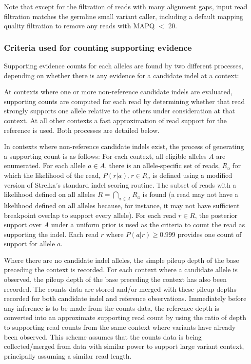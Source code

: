 \documentclass{article}
\begin{document}
Note that except for the filtration of reads with many alignment gaps, input read filtration matches the germline small variant caller, including a default mapping quality filtration to remove any reads with MAPQ $<$ 20.

\subsubsection{Criteria used for counting supporting evidence}

Supporting evidence counts for each alleles are found by two different processes, depending on whether there is any evidence for a candidate indel at a context:

At contexts where one or more non-reference candidate indels are evaluated, supporting counts are computed for each read by determining whether that read strongly supports one allele relative to the others under consideration at that context. At all other contexts a fast approximation of read support for the reference is used. Both processes are detailed below.

In contexts where non-reference candidate indels exist, the process of generating a supporting count is as follows: For each context, all eligible alleles $A$ are enumerated. For each allele $a \in A$, there is an allele-specific set of reads, $R_a$ for which the likelihood of the read, $P( r \vert a ), r \in R_a$ is defined using a modified version of Strelka's standard indel scoring routine. The subset of reads with a likelihood defined on all alleles $R = \bigcap_{a \in A} R_a$ is found (a read may not have a likelihood defined on all alleles because, for instance, it may not have sufficient breakpoint overlap to support every allele). For each read $r \in R$, the posterior support over $A$ under a uniform prior is used as the criteria to count the read as supporting the indel. Each read $r$ where $P( a \vert r ) \geq 0.999$ provides one count of support for allele $a$.

Where there are no candidate indel alleles, the simple pileup depth of the base preceding the context is recorded. For each context where a candidate allele is observed, the pileup depth of the base preceding the context has also been recorded. The counts data are stored and/or merged with these pileup depths recorded for both candidate indel and reference observations. Immediately before any inference is to be made from the counts data, the reference depth is converted into an approximate supporting read count by using the ratio of depth to supporting read counts from the same context where variants have already been observed. This scheme assumes that the counts data is being collected/merged from data with similar power to support large variant context, principally assuming a similar read length.
\end{document}
